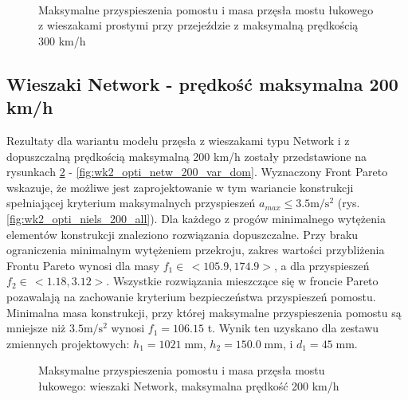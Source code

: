 \begin{figure}[hbt!]
	\centering
	\\
	\captionsetup{justification=centering}
	\caption{Maksymalne przyspieszenia pomostu i masa przęsła mostu łukowego z wieszakami prostymi przy przejeździe z maksymalną prędkością 300 km/h}
	\label{fig:wk2_opti_netw_160_var_dom}
\end{figure}


\clearpage


\subsection{Wieszaki Network - prędkość maksymalna 200 km/h}

Rezultaty dla wariantu modelu przęsła z wieszakami typu Network i z dopuszczalną prędkością maksymalną 200 km/h zostały przedstawione na rysunkach \ref{fig:wk2_opti_netw_200_all} - \ref{fig:wk2_opti_netw_200_var_dom}. Wyznaczony Front Pareto wskazuje, że możliwe jest zaprojektowanie w tym wariancie konstrukcji spełniającej kryterium maksymalnych przyspieszeń $a_{max}\le 3.5 \mathrm{m/s^2}$ (rys. \ref{fig:wk2_opti_niels_200_all}). Dla każdego z progów minimalnego wytężenia elementów konstrukcji znaleziono rozwiązania dopuszczalne. Przy braku ograniczenia minimalnym wytężeniem przekroju, zakres wartości przybliżenia Frontu Pareto wynosi dla masy $f_1 \in\,<105.9,174.9>$, a dla przyspieszeń $f_2 \in\,<1.18,3.12>$. Wszystkie rozwiązania mieszczące się w froncie Pareto pozawalają na zachowanie kryterium bezpieczeństwa przyspieszeń pomostu. Minimalna masa konstrukcji, przy której maksymalne przyspieszenia pomostu są mniejsze niż $3.5 \mathrm{m/s^2}$ wynosi $f_1 = 106.15$ t. Wynik ten uzyskano dla zestawu zmiennych projektowych: $h_1 = 1021\;\mathrm{mm}$, $h_2 = 150.0\;\mathrm{mm}$, i $d_1 = 45\;\mathrm{mm}$.


\begin{figure}[hbt!]
	\centering
	\captionsetup{justification=centering}
	\caption{Maksymalne przyspieszenia pomostu i masa przęsła mostu łukowego: wieszaki Network, maksymalna prędkość 200 km/h}
	\label{fig:wk2_opti_netw_200_all}
\end{figure}

